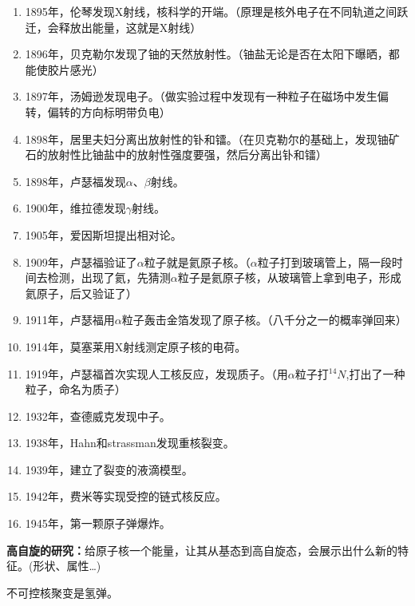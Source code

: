 \begin{enumerate}
    \item 1895年，伦琴发现X射线，核科学的开端。（原理是核外电子在不同轨道之间跃迁，会释放出能量，这就是X射线）
    \item 1896年，贝克勒尔发现了铀的天然放射性。（铀盐无论是否在太阳下曝晒，都能使胶片感光）
    \item 1897年，汤姆逊发现电子。（做实验过程中发现有一种粒子在磁场中发生偏转，偏转的方向标明带负电）
    \item 1898年，居里夫妇分离出放射性的钋和镭。（在贝克勒尔的基础上，发现铀矿石的放射性比铀盐中的放射性强度要强，然后分离出钋和镭）
    \item 1898年，卢瑟福发现$\alpha$、$\beta$射线。
    \item 1900年，维拉德发现$\gamma$射线。
    \item 1905年，爱因斯坦提出相对论。
    \item 1909年，卢瑟福验证了$\alpha$粒子就是氦原子核。（$\alpha$粒子打到玻璃管上，隔一段时间去检测，出现了氦，先猜测$\alpha$粒子是氦原子核，从玻璃管上拿到电子，形成氦原子，后又验证了）
    \item 1911年，卢瑟福用$\alpha$粒子轰击金箔发现了原子核。（八千分之一的概率弹回来）
    \item 1914年，莫塞莱用X射线测定原子核的电荷。
    \item 1919年，卢瑟福首次实现人工核反应，发现质子。（用$\alpha$粒子打$^{14}N$,打出了一种粒子，命名为质子）
    \item 1932年，查德威克发现中子。
    \item 1938年，Hahn和strassman发现重核裂变。
    \item 1939年，建立了裂变的液滴模型。
    \item 1942年，费米等实现受控的链式核反应。
    \item 1945年，第一颗原子弹爆炸。
\end{enumerate}

\textbf{高自旋的研究：}给原子核一个能量，让其从基态到高自旋态，会展示出什么新的特征。(形状、属性\dots)

不可控核聚变是氢弹。

\clearpage